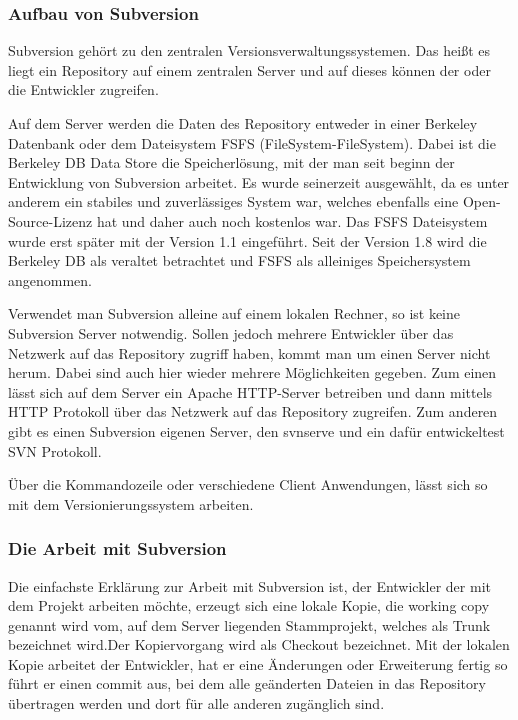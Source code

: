 \subsubsection{Aufbau von Subversion}
Subversion gehört zu den zentralen Versionsverwaltungssystemen. Das heißt es liegt ein Repository auf einem zentralen Server und auf dieses können der oder die Entwickler zugreifen.

Auf dem Server werden die Daten des Repository entweder in einer Berkeley Datenbank oder dem Dateisystem FSFS (FileSystem-FileSystem). Dabei ist die Berkeley DB Data Store die Speicherlösung, mit der man seit beginn der Entwicklung von Subversion arbeitet. Es wurde seinerzeit ausgewählt, da es unter anderem ein stabiles und zuverlässiges System war, welches ebenfalls eine Open-Source-Lizenz hat und daher auch noch kostenlos war. Das FSFS Dateisystem wurde erst später mit der Version 1.1 eingeführt. Seit der Version 1.8 wird die Berkeley DB als veraltet betrachtet und FSFS als alleiniges Speichersystem angenommen. 

Verwendet man Subversion alleine auf einem lokalen Rechner, so ist keine Subversion Server notwendig. Sollen jedoch mehrere Entwickler über das Netzwerk auf das Repository zugriff haben, kommt man um einen Server nicht herum. Dabei sind auch hier wieder mehrere Möglichkeiten gegeben. Zum einen lässt sich auf dem Server ein Apache HTTP-Server betreiben und dann mittels HTTP Protokoll über das Netzwerk auf das Repository zugreifen. Zum anderen gibt es einen Subversion eigenen Server, den svnserve und ein dafür entwickeltest SVN Protokoll. 

Über die Kommandozeile oder verschiedene Client Anwendungen, lässt sich so mit dem Versionierungssystem arbeiten. 

\subsubsection{Die Arbeit mit Subversion}

Die einfachste Erklärung zur Arbeit mit Subversion ist, der Entwickler der mit dem Projekt arbeiten möchte, erzeugt sich eine lokale Kopie, die working copy genannt wird vom, auf dem Server liegenden Stammprojekt, welches als Trunk bezeichnet wird.Der Kopiervorgang wird als Checkout bezeichnet. Mit der lokalen Kopie arbeitet der Entwickler, hat er eine Änderungen oder Erweiterung fertig so führt er einen commit aus, bei dem alle geänderten Dateien in das Repository übertragen werden und dort für alle anderen zugänglich sind. 

